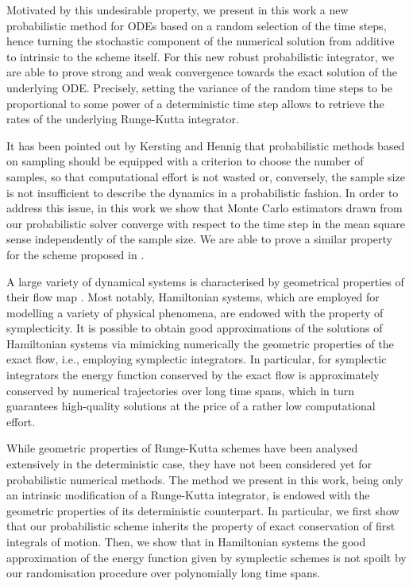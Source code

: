 \documentclass[final,onefignum,onetabnum]{siamonline171218}
\begin{document}
Motivated by this undesirable property, we present in this work a new probabilistic method for ODEs based on a random selection of the time steps, hence turning the stochastic component of the numerical solution from additive to intrinsic to the scheme itself. For this new robust probabilistic integrator, we are able to prove strong and weak convergence towards the exact solution of the underlying ODE. Precisely, setting the variance of the random time steps to be proportional to some power of a deterministic time step allows to retrieve the rates of the underlying Runge-Kutta integrator.

It has been pointed out by Kersting and Hennig \cite{KeH16} that probabilistic methods based on sampling should be equipped with a criterion to choose the number of samples, so that computational effort is not wasted or, conversely, the sample size is not insufficient to describe the dynamics in a probabilistic fashion. In order to address this issue, in this work we show that Monte Carlo estimators drawn from our probabilistic solver converge with respect to the time step in the mean square sense independently of the sample size. We are able to prove a similar property for the scheme proposed in \cite{CGS16}.

A large variety of dynamical systems is characterised by geometrical properties of their flow map \cite{HLW06}. Most notably, Hamiltonian systems, which are employed for modelling a variety of physical phenomena, are endowed with the property of symplecticity. It is possible to obtain good approximations of the solutions of Hamiltonian systems via mimicking numerically the geometric properties of the exact flow, i.e., employing symplectic integrators. In particular, for symplectic integrators the energy function conserved by the exact flow is approximately conserved by numerical trajectories over long time spans, which in turn guarantees high-quality solutions at the price of a rather low computational effort. 

While geometric properties of Runge-Kutta schemes have been analysed extensively in the deterministic case, they have not been considered yet for probabilistic numerical methods. The method we present in this work, being only an intrinsic modification of a Runge-Kutta integrator, is endowed with the geometric properties of its deterministic counterpart. In particular, we first show that our probabilistic scheme inherits the property of exact conservation of first integrals of motion. Then, we show that in Hamiltonian systems the good approximation of the energy function given by symplectic schemes is not spoilt by our randomisation procedure over polynomially long time spans.
\end{document}
